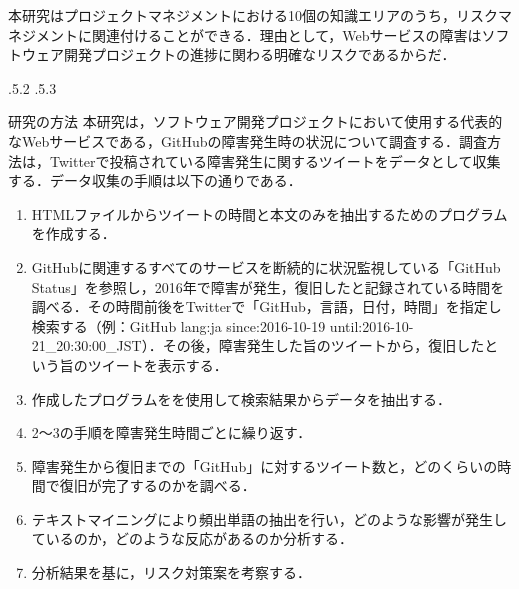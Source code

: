 \documentclass[uplatex]{jsarticle}
\makeatletter
\renewcommand{\section}{%
    \if@slide\clearpage\fi
    \@startsection{section}{1}{\z@}%
    {\Cvs \@plus.5\Cdp \@minus.2\Cdp}%
    {.5\Cvs \@plus.3\Cdp}%
    {\normalfont\raggedright}}
\makeatother
\begin{document}
本研究はプロジェクトマネジメントにおける10個の知識エリアのうち，リスクマネジメントに関連付けることができる．理由として，Webサービスの障害はソフトウェア開発プロジェクトの進捗に関わる明確なリスクであるからだ．

\section{研究の方法}
本研究は，ソフトウェア開発プロジェクトにおいて使用する代表的なWebサービスである，GitHubの障害発生時の状況について調査する．調査方法は，Twitterで投稿されている障害発生に関するツイートをデータとして収集する．データ収集の手順は以下の通りである\cite{03}．
\begin{enumerate}
 \item HTMLファイルからツイートの時間と本文のみを抽出するためのプログラムを作成する\cite{04}．
 \item GitHubに関連するすべてのサービスを断続的に状況監視している「GitHub Status」を参照し，2016年で障害が発生，復旧したと記録されている時間を調べる．その時間前後をTwitterで「GitHub，言語，日付，時間」を指定し検索する（例：GitHub lang:ja since:2016-10-19 until:2016-10-21\_20:30:00\_JST）．その後，障害発生した旨のツイートから，復旧したという旨のツイートを表示する．
 \item 作成したプログラムをを使用して検索結果からデータを抽出する．
 \item 2～3の手順を障害発生時間ごとに繰り返す．
 \item 障害発生から復旧までの「GitHub」に対するツイート数と，どのくらいの時間で復旧が完了するのかを調べる．
 \item テキストマイニングにより頻出単語の抽出を行い，どのような影響が発生しているのか，どのような反応があるのか分析する．
 \item 分析結果を基に，リスク対策案を考察する．
\end{enumerate}
\end{document}
